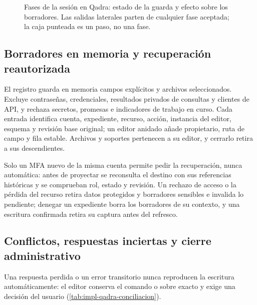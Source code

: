 \begin{figure}[!htbp]
  \centering
  
  \caption{Fases de la sesión en Qadra: estado de la guarda y efecto sobre los borradores. Las salidas laterales parten de cualquier fase aceptada; la caja punteada es un paso, no una fase.}
  \label{fig:impl-qadra-sesion}
\end{figure}

\subsection{Borradores en memoria y recuperación reautorizada}\label{sec:impl-qadra-borradores}

El registro guarda en memoria campos explícitos y archivos seleccionados. Excluye contraseñas, credenciales, resultados privados de consultas y clientes de API, y rechaza secretos, promesas e indicadores de trabajo en curso. Cada entrada identifica cuenta, expediente, recurso, acción, instancia del editor, esquema y revisión base original; un editor anidado añade propietario, ruta de campo y fila estable. Archivos y soportes pertenecen a su editor, y cerrarlo retira a sus descendientes.

Solo un MFA nuevo de la misma cuenta permite pedir la recuperación, nunca automática: antes de proyectar se reconsulta el destino con sus referencias históricas y se comprueban rol, estado y revisión. Un rechazo de acceso o la pérdida del recurso retira datos protegidos y borradores sensibles e invalida lo pendiente; denegar un expediente borra los borradores de su contexto, y una escritura confirmada retira su captura antes del refresco.

\subsection{Conflictos, respuestas inciertas y cierre administrativo}\label{sec:impl-qadra-conciliacion}

Una respuesta perdida o un error transitorio nunca reproducen la escritura automáticamente: el editor conserva el comando o sobre exacto y exige una decisión del usuario (\cref{tab:impl-qadra-conciliacion}).

